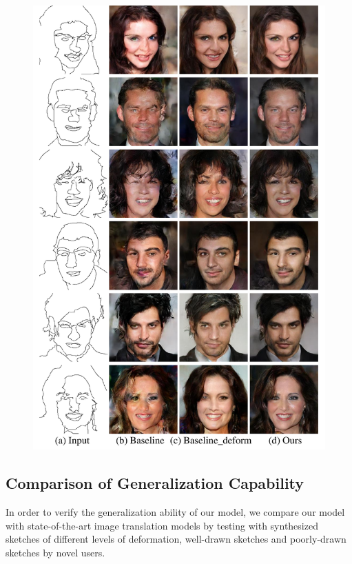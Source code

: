 \begin{figure}
	\includegraphics[width=0.9\linewidth]{figs/generalization_examples}
	\caption{}
	\label{fig:generative_quality}
\end{figure}

\subsection{Comparison of Generalization Capability}

In order to verify the generalization ability of our model, we compare our model with state-of-the-art image translation models by testing with synthesized sketches of different levels of deformation, well-drawn sketches and poorly-drawn sketches by novel users.


